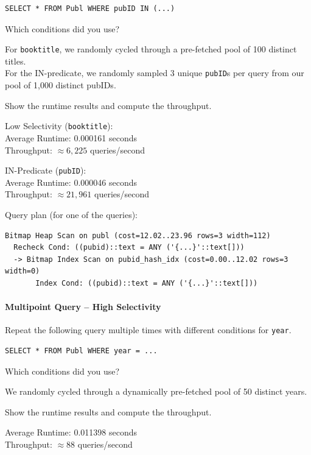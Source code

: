 \documentclass[11pt]{scrartcl}
\begin{document}
\begin{lstlisting}[style=dbtsql]
SELECT * FROM Publ WHERE pubID IN (...)
\end{lstlisting}


Which conditions did you use?

For \texttt{booktitle}, we randomly cycled through a pre-fetched pool of 100 distinct titles. \\
For the IN-predicate, we randomly sampled 3 unique \texttt{pubID}s per query from our pool of 1,000 distinct pubIDs.

Show the runtime results and compute the throughput.

Low Selectivity (\texttt{booktitle}): \\
Average Runtime: 0.000161 seconds \\
Throughput: $\approx 6,225$ queries/second

\vspace{0.5em}
IN-Predicate (\texttt{pubID}): \\
Average Runtime: 0.000046 seconds \\
Throughput: $\approx 21,961$ queries/second

Query plan (for one of the queries):

{\small
\parskip0pt\begin{verbatim}
Bitmap Heap Scan on publ (cost=12.02..23.96 rows=3 width=112)
  Recheck Cond: ((pubid)::text = ANY ('{...}'::text[]))
  -> Bitmap Index Scan on pubid_hash_idx (cost=0.00..12.02 rows=3 width=0)
       Index Cond: ((pubid)::text = ANY ('{...}'::text[]))
\end{verbatim}}

\paragraph{Multipoint Query -- High Selectivity}

Repeat the following query multiple times with different conditions for \texttt{year}.

\begin{lstlisting}[style=dbtsql]
SELECT * FROM Publ WHERE year = ...
\end{lstlisting}

Which conditions did you use?

We randomly cycled through a dynamically pre-fetched pool of 50 distinct years.

Show the runtime results and compute the throughput.

Average Runtime: 0.011398 seconds \\
Throughput: $\approx 88$ queries/second
\end{document}
